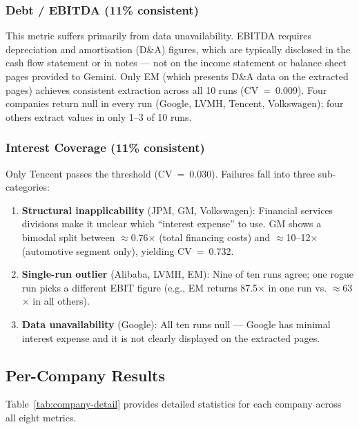 \documentclass[12pt, a4paper]{article}
\begin{document}
\subsubsection{Debt / EBITDA (11\% consistent)}

This metric suffers primarily from data unavailability.  EBITDA requires
depreciation and amortisation (D\&A) figures, which are typically disclosed
in the cash flow statement or in notes --- not on the income statement or
balance sheet pages provided to Gemini.  Only EM (which presents D\&A
data on the extracted pages) achieves consistent extraction across all 10
runs (CV~=~0.009).  Four companies return null in every run (Google, LVMH,
Tencent, Volkswagen); four others extract values in only 1--3 of 10 runs.

\subsubsection{Interest Coverage (11\% consistent)}

Only Tencent passes the threshold (CV~=~0.030).  Failures fall into three
sub-categories:
\begin{enumerate}[noitemsep]
  \item \textbf{Structural inapplicability} (JPM, GM, Volkswagen): Financial
        services divisions make it unclear which ``interest expense'' to use.
        GM shows a bimodal split between $\approx$0.76$\times$ (total
        financing costs) and $\approx$10--12$\times$ (automotive segment
        only), yielding CV~=~0.732.
  \item \textbf{Single-run outlier} (Alibaba, LVMH, EM): Nine of ten runs
        agree; one rogue run picks a different EBIT figure (e.g., EM returns
        87.5$\times$ in one run vs. $\approx$63$\times$ in all others).
  \item \textbf{Data unavailability} (Google): All ten runs null --- Google
        has minimal interest expense and it is not clearly displayed on the
        extracted pages.
\end{enumerate}

\subsection{Per-Company Results}

Table~\ref{tab:company-detail} provides detailed statistics for each
company across all eight metrics.
\end{document}
